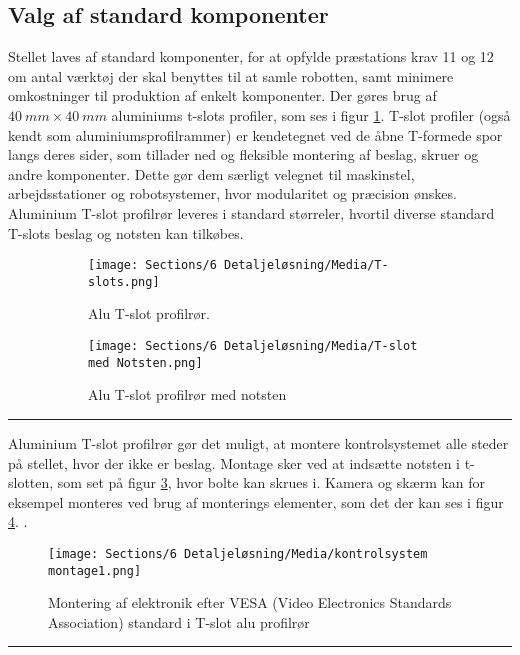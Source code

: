 \subsection{Valg af standard komponenter} \label{Standard komponenter}
Stellet laves af standard komponenter, for at opfylde præstations krav 11 og 12 om antal værktøj der skal benyttes til at samle robotten, samt minimere omkostninger til produktion af enkelt komponenter. Der gøres brug af $\SI{40}{mm}\times\SI{40}{mm}$ aluminiums t-slots profiler, som ses i figur \ref{fig:T-slot profil 1}. T-slot profiler (også kendt som aluminiumsprofilrammer) er kendetegnet ved de åbne T-formede spor langs deres sider, som tillader ned og fleksible montering af beslag, skruer og andre komponenter. Dette gør dem særligt velegnet til maskinstel, arbejdsstationer og robotsystemer, hvor modularitet og præcision ønskes. Aluminium T-slot profilrør leveres i standard størreler, hvortil diverse standard T-slots beslag og notsten kan tilkøbes. \parencite{McMaster-Carr2025T-slottedFraming}

\begin{figure}[H]
    \centering
    \begin{subfigure}[b]{0.48\textwidth}
        \texttt{[image: Sections/6 Detaljeløsning/Media/T-slots.png]}
        \caption{Alu T-slot profilrør. \parencite{McMaster-Carr2025T-SlottedRails}} 
        \label{fig:T-slot profil 1}
    \end{subfigure}
    \hfill
    \begin{subfigure}[b]{0.48\textwidth}
    \centering
        \texttt{[image: Sections/6 Detaljeløsning/Media/T-slot med Notsten.png]}
        \caption{Alu T-slot profilrør med notsten} 
        \label{fig: T-slot profil med notsten}
    \end{subfigure}
    \caption{}
\end{figure} \plainbreak{-1}

Aluminium T-slot profilrør gør det muligt, at montere kontrolsystemet alle steder på stellet, hvor der ikke er beslag. Montage sker ved at indsætte notsten i t-slotten, som set på figur \ref{fig: T-slot profil med notsten}, hvor bolte kan skrues i. Kamera og skærm kan for eksempel monteres ved brug af monterings elementer, som det der kan ses i figur \ref{fig:T-slot tablet holder}. \parencite{McMaster-Carr2025T-slottedFraming}.

\begin{figure}[H]
    \centering
    \texttt{[image: Sections/6 Detaljeløsning/Media/kontrolsystem montage1.png]}
    \caption{Montering af elektronik efter VESA (Video Electronics Standards Association) standard i T-slot alu profilrør }
    \label{fig:T-slot tablet holder}
\end{figure} \plainbreak{-1}

